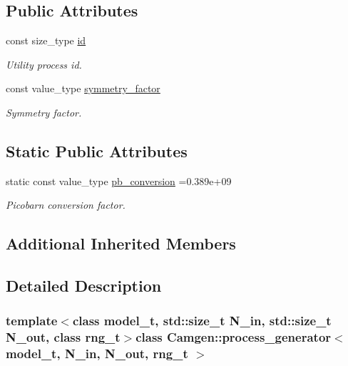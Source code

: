 \subsection*{Public Attributes}
\begin{DoxyCompactItemize}
\item 
\hypertarget{a00430_acae85c36c314e989b9a59c1366673a31}{const size\-\_\-type \hyperlink{a00430_acae85c36c314e989b9a59c1366673a31}{id}}\label{a00430_acae85c36c314e989b9a59c1366673a31}

\begin{DoxyCompactList}\small\item\em Utility process id. \end{DoxyCompactList}\item 
\hypertarget{a00430_a0d1ad7bb4f81fe4fcde182e0073e042c}{const value\-\_\-type \hyperlink{a00430_a0d1ad7bb4f81fe4fcde182e0073e042c}{symmetry\-\_\-factor}}\label{a00430_a0d1ad7bb4f81fe4fcde182e0073e042c}

\begin{DoxyCompactList}\small\item\em Symmetry factor. \end{DoxyCompactList}\end{DoxyCompactItemize}
\subsection*{Static Public Attributes}
\begin{DoxyCompactItemize}
\item 
\hypertarget{a00430_ab15fa12a765dc3c2d5034a09793c2f71}{static const value\-\_\-type \hyperlink{a00430_ab15fa12a765dc3c2d5034a09793c2f71}{pb\-\_\-conversion} =0.\-389e+09}\label{a00430_ab15fa12a765dc3c2d5034a09793c2f71}

\begin{DoxyCompactList}\small\item\em Picobarn conversion factor. \end{DoxyCompactList}\end{DoxyCompactItemize}
\subsection*{Additional Inherited Members}


\subsection{Detailed Description}
\subsubsection*{template$<$class model\-\_\-t, std\-::size\-\_\-t N\-\_\-in, std\-::size\-\_\-t N\-\_\-out, class rng\-\_\-t$>$class Camgen\-::process\-\_\-generator$<$ model\-\_\-t, N\-\_\-in, N\-\_\-out, rng\-\_\-t $>$}

